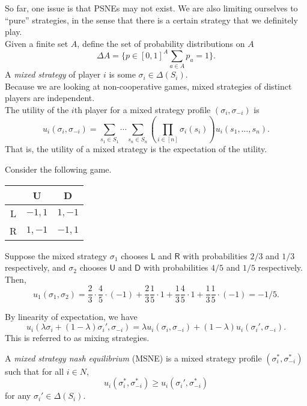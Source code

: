 	So far, one issue is that PSNEs may not exist. We are also limiting ourselves to ``pure'' strategies, in the sense that there is a certain strategy that we definitely play.\\

	Given a finite set $A$, define the set of probability distributions on $A$
	\[ \Delta A = \{ p \in [0,1]^{A} \sum_{a \in A} p_a = 1 \}. \]
	A \emph{mixed strategy} of player $i$ is some $\sigma_i \in \Delta(S_i)$.\\
	Because we are looking at non-cooperative games, mixed strategies of distinct players are independent.\\
	The utility of the $i$th player for a mixed strategy profile $(\sigma_i,\sigma_{-i})$ is
	\[ u_i(\sigma_i,\sigma_{-i}) = \sum_{s_1 \in S_1} \cdots \sum_{s_n \in S_n} \left( \prod_{i \in [n]} \sigma_i(s_i) \right) u_i(s_1,\ldots,s_n). \]
	That is, the utility of a mixed strategy is the expectation of the utility.

	\begin{fex}
		\label{ex: mixed strategy}
		Consider the following game.
		\begin{center}
		\begin{tabular}{|c||c|c|}
			\hline
			& \textsf{U} & \textsf{D} \\ \hline\hline
			\textsf{L} & $-1,1$ & $1,-1$ \\ \hline
			\textsf{R} & $1,-1$ & $-1,1$ \\ \hline
		\end{tabular}
		\end{center}
		Suppose the mixed strategy $\sigma_1$ chooses $\mathsf{L}$ and $\mathsf{R}$ with probabilities $2/3$ and $1/3$ respectively, and $\sigma_2$ chooses $\mathsf{U}$ and $\mathsf{D}$ with probabilities $4/5$ and $1/5$ respectively. Then,
		\[ u_1(\sigma_1,\sigma_2) = \frac{2}{3}\cdot\frac{4}{5}\cdot(-1) + \frac{2}{3}\frac{1}{5}\cdot 1 + \frac{1}{3}\frac{4}{5}\cdot 1 + \frac{1}{3}\frac{1}{5}\cdot (-1) = -1/5. \] 
	\end{fex}

	By linearity of expectation, we have
	\begin{equation}
		\label{eqn: mixing strategies}
		u_i(\lambda \sigma_i + (1-\lambda)\sigma_i',\sigma_{-i}) = \lambda u_i(\sigma_i,\sigma_{-i}) + (1-\lambda) u_i(\sigma_i',\sigma_{-i}).
	\end{equation}
	This is referred to as mixing strategies.

	\begin{fdef}
		A \emph{mixed strategy nash equilibrium} (MSNE) is a mixed strategy profile $(\sigma_i^*,\sigma_{-i}^*)$ such that for all $i \in N$,
		\[ u_i(\sigma_i^*,\sigma_{-i}^*) \ge u_i(\sigma_i',\sigma_{-i}^*) \]
		for any $\sigma_i' \in \Delta(S_i)$.
	\end{fdef}

